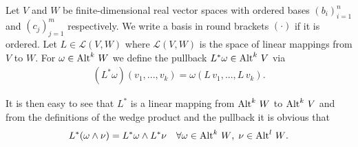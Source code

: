 \documentclass[../master_thesis.tex]{subfiles}
\begin{document}
\begin{definition}
    Let $V$ and $W$ be finite-dimensional real
    vector spaces with ordered bases $(b_i)_{i=1}^n$ and $(c_j)_{j=1}^m$ 
    respectively. We write a basis in round brackets $(\cdot)$ if it is 
    ordered. Let $L \in \mathcal{L}(V,W)$ where $\mathcal{L}(V,W)$ is the 
    space of linear mappings from $V$ to $W$. For $\omega \in {\operatorname{Alt}^{k}\,W}$
    we define the pullback $L^* \omega \in {\operatorname{Alt}^{k}\,V}$ via 
    \begin{align*}
        (L^* \omega)(v_1,...,v_k) = \omega(L\,v_1,...,L\,v_k).
    \end{align*} 
\end{definition}
It is then easy to see that 
$L^*$ is a linear mapping from ${\operatorname{Alt}^{k}\,W}$ to 
${\operatorname{Alt}^{k}\,V}$
and from the definitions of the wedge product and 
the pullback it is obvious that
\begin{align*}
    L^*(\omega \wedge \nu) = L^*\omega \wedge L^* \nu \quad \forall 
        \omega \in {\operatorname{Alt}^{k}\,W}, \; \nu \in {\operatorname{Alt}^{l}\,W}.
\end{align*}
\end{document}
